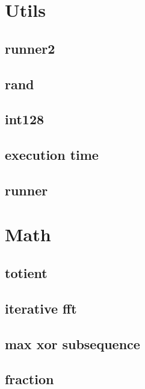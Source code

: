 \section{Utils}
\subsection{runner2}
\raggedbottom
\hrulefill
\subsection{rand}
\raggedbottom
\hrulefill
\subsection{  int128}
\raggedbottom
\hrulefill
\subsection{execution time}
\raggedbottom
\hrulefill
\subsection{runner}
\raggedbottom
\hrulefill

\section{Math}
\subsection{totient}
\raggedbottom
\hrulefill
\subsection{iterative fft}
\raggedbottom
\hrulefill
\subsection{max xor subsequence}
\raggedbottom
\hrulefill
\subsection{fraction}
\raggedbottom
\hrulefill

